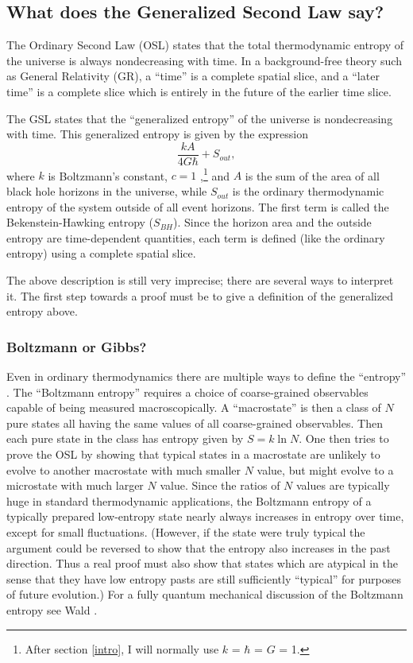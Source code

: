 \documentclass{article}
\begin{document}
\subsection{What does the Generalized Second Law say?}\label{def}

The Ordinary Second Law (OSL) states that the total thermodynamic entropy of the universe is always nondecreasing with time.  In a background-free theory such as General Relativity (GR), a ``time'' is a complete spatial slice, and a ``later time'' is a complete slice which is entirely in the future of the earlier time slice.

The GSL states that the ``generalized entropy'' of the universe is nondecreasing with time.  This generalized entropy is given by the expression
\begin{equation}\label{Gen}
\frac{kA}{4G \hbar} + S_{out},
\end{equation}
where $k$ is Boltzmann's constant, $c = 1$ \cite{hawking75},\footnote{After section \ref{intro}, I will normally use $k$ = $\hbar$ = $G$ = 1.} and $A$ is the sum of the area of all black hole horizons in the universe, while $S_{out}$ is the ordinary thermodynamic entropy of the system outside of all event horizons.  The first term is called the Bekenstein-Hawking entropy ($S_{BH}$).  Since the horizon area and the outside entropy are time-dependent quantities, each term is defined (like the ordinary entropy) using a complete spatial slice.

The above description is still very imprecise; there are several ways to interpret it.  The first step towards a proof must be to give a definition of the generalized entropy above.

\subsubsection{Boltzmann or Gibbs?}\label{borg}

Even in ordinary thermodynamics there are multiple ways to define the ``entropy'' \cite{jaynes65}.  The ``Boltzmann entropy'' requires a choice of coarse-grained observables capable of being measured macroscopically.  A ``macro\-state'' is then a class of $N$ pure states all having the same values of all coarse-grained observables.  Then each pure state in the class has entropy given by 
$S = k\ln N$.  One then tries to prove the OSL by showing that typical states in a macrostate are unlikely to evolve to  another macrostate with much smaller $N$ value, but might evolve to a microstate with much larger $N$ value.  Since the ratios of $N$ values are typically huge in standard thermodynamic applications, the Boltzmann entropy of a typically prepared low-entropy state nearly always increases in entropy over time, except for small fluctuations.  (However, if the state were truly typical the argument could be reversed to show that the entropy also increases in the past direction.  Thus a real proof must also show that states which are atypical in the sense that they have low entropy pasts are still sufficiently ``typical'' for purposes of future evolution.)  For a fully quantum mechanical discussion of the Boltzmann entropy see Wald \cite{wald79}.
\end{document}
